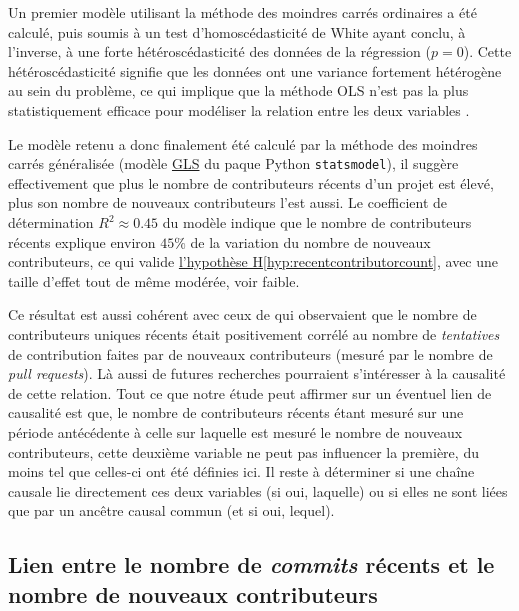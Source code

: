 \documentclass[dvipsnames,runningheads]{llncs}
\newcommand{\en}[1]{\foreignlanguage{english}{\emph{#1}}}
\begin{document}
    Un premier modèle utilisant la méthode des moindres carrés ordinaires a été calculé, puis soumis à un test
    d'homoscédasticité de White ayant conclu, à l'inverse, à une forte hétéroscédasticité des données de la
    régression ($p = 0$). Cette hétéroscédasticité signifie que les données ont une variance fortement
    hétérogène au sein du problème, ce qui implique que la méthode OLS n'est pas la plus statistiquement
    efficace pour modéliser la relation entre les deux variables \parencite{GLS-2021}.

    Le modèle retenu a donc finalement été calculé par la méthode des moindres carrés généralisée (modèle
    \href{https://www.statsmodels.org/dev/generated/statsmodels.regression.linear_model.GLS.html}{GLS} du
    paque Python \texttt{statsmodel}), il suggère effectivement que plus le nombre de contributeurs récents
    d'un projet est élevé, plus son nombre de nouveaux contributeurs l'est aussi. Le coefficient de
    détermination $R^2 \approx 0.45$ du modèle indique que le nombre de contributeurs récents explique environ
    $45\%$ de la variation du nombre de nouveaux contributeurs, ce qui valide
    \hyperref[hyp:recentcontributorcount]{l'hypothèse H\ref*{hyp:recentcontributorcount}}, avec une taille
    d'effet tout de même modérée, voir faible.

    Ce résultat est aussi cohérent avec ceux de \textcite[p.~12-13,16]{signals-2019} qui observaient que le
    nombre de contributeurs uniques récents était positivement corrélé au nombre de \emph{tentatives} de
    contribution faites par de nouveaux contributeurs (mesuré par le nombre de \en{pull requests}). Là aussi
    de futures recherches pourraient s'intéresser à la causalité de cette relation. Tout ce que notre étude
    peut affirmer sur un éventuel lien de causalité est que, le nombre de contributeurs récents étant mesuré
    sur une période antécédente à celle sur laquelle est mesuré le nombre de nouveaux contributeurs, cette
    deuxième variable ne peut pas influencer la première, du moins tel que celles-ci ont été définies ici. Il
    reste à déterminer si une chaîne causale lie directement ces deux variables (si oui, laquelle) ou si elles
    ne sont liées que par un ancêtre causal commun (et si oui, lequel).

    \subsection{Lien entre le nombre de \en{commits} récents et le nombre de nouveaux contributeurs}
\end{document}
